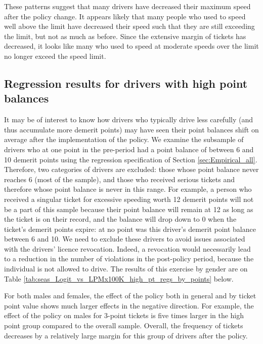 These patterns suggest that many drivers have decreased their maximum speed 
after the policy change. 
It appears likely that many people who used to speed well above the limit 
have decreased their speed such that they are still exceeding the limit, 
but not as much as before. 
Since the extensive margin of tickets has decreased, 
it looks like many who used to speed at moderate speeds over the limit 
no longer exceed the speed limit.


\subsection{Regression results for drivers with high point balances}
\label{sec:Empirical_high_pts}

It may be of interest to know how drivers who typically drive less carefully 
(and thus accumulate more demerit points) 
may have seen their point balances shift on average after the implementation of the policy. 
We examine the subsample of drivers who at one point in the pre-period 
had a point balance of between 6 and 10 demerit points 
using the regression specification of 
Section \ref{sec:Empirical_all}. 
Therefore, two categories of drivers are excluded: 
those whose point balance never reaches 6 (most of the sample), 
and those who received serious tickets and therefore whose point balance is never in this range. 
For example, a person who received a singular ticket for excessive speeding worth 12 demerit points 
will not be a part of this sample because their point balance will remain at 12 
as long as the ticket is on their record, 
and the balance will drop down to 0 when the ticket’s demerit points expire: 
at no point was this driver’s demerit point balance between 6 and 10. 
We need to exclude these drivers to avoid issues associated with the drivers’ licence revocation. 
Indeed, a revocation would necessarily lead to a reduction in the number of violations 
in the post-policy period, because the individual is not allowed to drive. 
The results of this exercise by gender are on 
Table \ref{tab:seas_Logit_vs_LPMx100K_high_pt_regs_by_points} below. 




For both males and females, 
the effect of the policy both in general and by ticket point value 
shows much larger effects in the negative direction. 
For example, the effect of the policy on males for 3-point tickets is five times larger 
in the high point group compared to the overall sample. 
Overall, the frequency of tickets decreases by a relatively large margin 
for this group of drivers after the policy.




